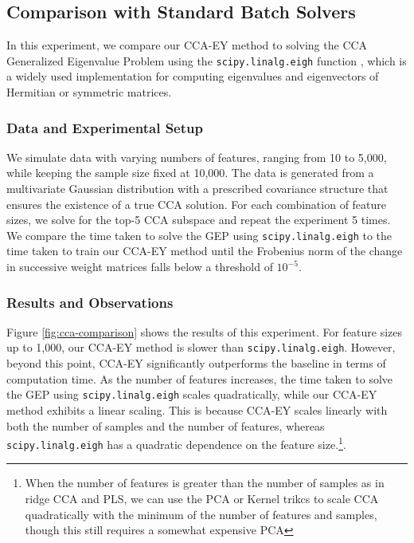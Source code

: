 \subsection{Comparison with Standard Batch Solvers}
In this experiment, we compare our CCA-EY method to solving the CCA Generalized Eigenvalue Problem using the \texttt{scipy.linalg.eigh} function \citep{virtanen2020scipy}, which is a widely used implementation for computing eigenvalues and eigenvectors of Hermitian or symmetric matrices.
\subsubsection{Data and Experimental Setup}
We simulate data with varying numbers of features, ranging from 10 to 5,000, while keeping the sample size fixed at 10,000. The data is generated from a multivariate Gaussian distribution with a prescribed covariance structure that ensures the existence of a true CCA solution.
For each combination of feature sizes, we solve for the top-5 CCA subspace and repeat the experiment 5 times. We compare the time taken to solve the GEP using \texttt{scipy.linalg.eigh} to the time taken to train our CCA-EY method until the Frobenius norm of the change in successive weight matrices falls below a threshold of $10^{-5}$.
\subsubsection{Results and Observations}
Figure \ref{fig:cca-comparison} shows the results of this experiment. For feature sizes up to 1,000, our CCA-EY method is slower than \texttt{scipy.linalg.eigh}. However, beyond this point, CCA-EY significantly outperforms the baseline in terms of computation time.
As the number of features increases, the time taken to solve the GEP using \texttt{scipy.linalg.eigh} scales quadratically, while our CCA-EY method exhibits a linear scaling. This is because CCA-EY scales linearly with both the number of samples and the number of features, whereas \texttt{scipy.linalg.eigh} has a quadratic dependence on the feature size.\footnote{When the number of features is greater than the number of samples as in ridge CCA and PLS, we can use the PCA or Kernel trikcs to scale CCA quadratically with the minimum of the number of features and samples, though this still requires a somewhat expensive PCA}.

